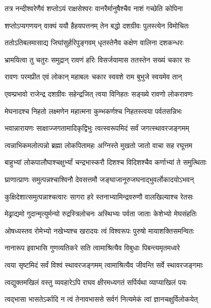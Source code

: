 \twolineshloka
{तत्र नन्दीश्वरेणैवं शप्तोऽयं राक्षसेश्वरः}
{वानरैर्मानुषैश्चैव नाशं गच्छेति कोपिना} %

\twolineshloka
{शप्तोऽप्यगणयन् वाक्यं ययौ हैहयपत्तनम्}
{तेन बद्धो दशग्रीवः पुलस्त्येन विमोचितः} %

\twolineshloka
{ततोऽतिबलमासाद्य जिघांसुर्हरिपुङ्गवम्}
{धृतस्तेनैव कक्षेण वालिना दशकन्धरः} %

\twolineshloka
{भ्रामयित्वा तु चतुरः समुद्रान् रावणं हरिः}
{विसर्जयामास ततस्तेन सख्यं चकार सः} %

\twolineshloka
{रावणः परमप्रीत एवं लोकान् महाबलः}
{चकार स्ववशे राम बुभुजे स्वयमेव तान्} %

\twolineshloka
{एवम्प्रभावो राजेन्द्र दशग्रीवः सहेन्द्रजित्}
{त्वया विनिहतः सङ्ख्ये रावणो लोकरावणः} %

\twolineshloka
{मेघनादश्च निहतो लक्ष्मणेन महात्मना}
{कुम्भकर्णश्च निहतस्त्वया पर्वतसन्निभः} %

\twolineshloka
{भवान्नारायणः साक्षाज्जगतामादिकृद्विभुः}
{त्वत्स्वरूपमिदं सर्वं जगत्स्थावरजङ्गमम्} %

\twolineshloka
{त्वन्नाभिकमलोत्पन्नो ब्रह्मा लोकपितामहः}
{अग्निस्ते मुखतो जातो वाचा सह रघूत्तम} %

\twolineshloka
{बाहुभ्यां लोकपालौघाश्चक्षुर्भ्यां चन्द्रभास्करौ}
{दिशश्च विदिशश्चैव कर्णाभ्यां ते समुत्थिताः} %

\twolineshloka
{घ्राणात्प्राणः समुत्पन्नश्चाश्विनौ देवसत्तमौ}
{जङ्घाजानूरुजघनाद्भुवर्लोकादयोऽभवन्} %

\twolineshloka
{कुक्षिदेशात्समुत्पन्नाश्चत्वारः सागरा हरे}
{स्तनाभ्यामिन्द्रवरुणौ वालखिल्याश्च रेतसः} %

\twolineshloka
{मेढ्राद्यमो गुदान्मृत्युर्मन्यो रुद्रस्त्रिलोचनः}
{अस्थिभ्यः पर्वता जाताः केशेभ्यो मेघसंहतिः} %

\twolineshloka
{ओषध्यस्तव रोमेभ्यो नखेभ्यश्च खरादयः}
{त्वं विश्वरूपः पुरुषो मायाशक्तिसमन्वितः} %

\twolineshloka
{नानारूप इवाभासि गुणव्यतिकरे सति}
{त्वामाश्रित्यैव विबुधाः पिबन्त्यमृतमध्वरे} %

\twolineshloka
{त्वया सृष्टमिदं सर्वं विश्वं स्थावरजङ्गमम्}
{त्वामाश्रित्यैव जीवन्ति सर्वे स्थावरजङ्गमाः} %

\twolineshloka
{त्वद्युक्तमखिलं वस्तु व्यवहारेऽपि राघव}
{क्षीरमध्यगतं सर्पिर्यथा व्याप्याखिलं पयः} %

\twolineshloka
{त्वद्भासा भासतेऽर्कादि न त्वं तेनावभाससे}
{सर्वगं नित्यमेकं त्वां ज्ञानचक्षुर्विलोकयेत्} %

